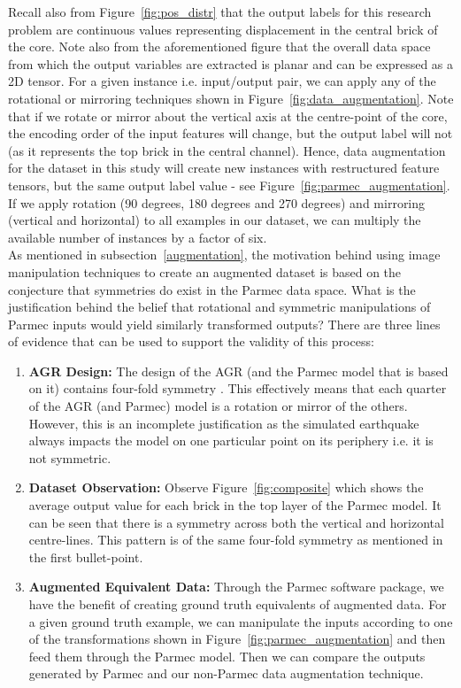 \noindent
Recall also from Figure~\ref{fig:pos_distr} that the output labels for this research problem are continuous values representing displacement in the central brick of the core. Note also from the aforementioned figure that the overall data space from which the output variables are extracted is planar and can be expressed as a 2D tensor. For a given instance i.e. input/output  pair, we can apply any of the rotational or mirroring techniques shown in Figure~\ref{fig:data_augmentation}. Note that if we rotate or mirror about the vertical axis at the centre-point of the core, the encoding order of the input features will change, but the output label will not (as it represents the top brick in the central channel). Hence, data augmentation for the dataset in this study will create new instances with restructured feature tensors, but the same output label value - see Figure~\ref{fig:parmec_augmentation}. 
\\

\noindent
If we apply rotation (90 degrees, 180 degrees and 270 degrees) and mirroring (vertical and horizontal) to all examples in our dataset, we can multiply the available number of instances by a factor of six. 
\\

\noindent
As mentioned in subsection~\ref{augmentation}, the motivation behind using image manipulation techniques to create an augmented dataset is based on the conjecture that symmetries do exist in the Parmec data space. What is the justification behind the belief that rotational and symmetric manipulations of Parmec inputs would yield similarly transformed outputs? There are three lines of evidence that can be used to support the validity of this process:
\\

\begin{enumerate}
	\item \textbf{AGR Design:} The design of the AGR (and the Parmec model that is based on it) contains four-fold symmetry \cite{nonbol1996description}. This effectively means that each quarter of the AGR (and Parmec) model is a rotation or mirror of the others. However, this is an incomplete justification as the simulated earthquake always impacts the model on one particular point on its periphery i.e. it is not symmetric.
	\item \textbf{Dataset Observation:} Observe Figure~\ref{fig:composite} which shows the average output value for each brick in the top layer of the Parmec model. It can be seen that there is a symmetry across both the vertical and horizontal centre-lines. This pattern is of the same four-fold symmetry as mentioned in the first bullet-point.
	\item \textbf{Augmented Equivalent Data:} Through the Parmec software package, we have the benefit of creating ground truth equivalents of augmented data. For a given ground truth example, we can manipulate the inputs according to one of the transformations shown in Figure~\ref{fig:parmec_augmentation} and then feed them through the Parmec model. Then we can compare the outputs generated by Parmec and our non-Parmec data augmentation technique.  
	
\end{enumerate}

